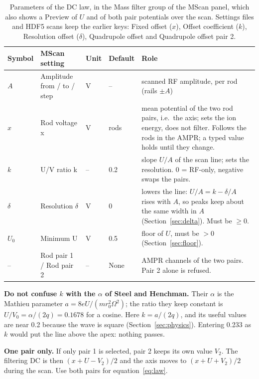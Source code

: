 \documentclass[10pt,a4paper]{article}
\newcommand{\setting}[1]{\textsf{#1}}
\begin{document}
\begin{table}[h]
\centering\small
\begin{tabularx}{\linewidth}{@{}l l l l X@{}}
\toprule
Symbol & MScan setting & Unit & Default & Role\\
\midrule
$A$ & \setting{Amplitude from / to / step} & V & -- & scanned RF amplitude, per rod (rails $\pm A$)\\
$x$ & \setting{Rod voltage x} & V & rods & mean potential of the two rod pairs, i.e.\ the axis; sets the
ion energy, does not filter. Follows the rods in the AMPR; a typed value holds until they change.\\
$k$ & \setting{U/V ratio k} & -- & 0.2 & slope $U/A$ of the scan line; sets the resolution.
$0$ = RF-only, negative swaps the pairs.\\
$\delta$ & \setting{Resolution $\delta$} & V & 0 & lowers the line: $U/A=k-\delta/A$ rises with
$A$, so peaks keep about the same width in $A$ (Section~\ref{sec:delta}). Must be $\ge0$.\\
$U_0$ & \setting{Minimum U} & V & 0.5 & floor of $U$, must be $>0$ (Section~\ref{sec:floor}).\\
-- & \setting{Rod pair 1 / Rod pair 2} & -- & None & AMPR channels of the two pairs.
Pair 2 alone is refused.\\
\bottomrule
\end{tabularx}
\caption{Parameters of the DC law, in the \setting{Mass filter} group of the MScan panel, which also
shows a \setting{Preview} of $U$ and of both pair potentials over the scan. Settings files and HDF5
scans keep the earlier keys: \setting{Fixed offset} ($x$), \setting{Offset coefficient} ($k$),
\setting{Resolution offset} ($\delta$), \setting{Quadrupole offset} and \setting{Quadrupole offset pair 2}.}
\end{table}

\textbf{Do not confuse $k$ with the $\alpha$ of Steel and Henchman.} Their $\alpha$ is the Mathieu
parameter $a=8eU/(m r_0^2\Omega^2)$; the ratio they keep constant is $U/V_0=\alpha/(2q)=0.1678$ for a
cosine. Here $k=a/(2q)$, and its useful values are near 0.2 because the wave is square
(Section~\ref{sec:physics}). Entering 0.233 as $k$ would put the line above the apex: nothing passes.

\textbf{One pair only.} If only pair 1 is selected, pair 2 keeps its own value $V_2$. The filtering DC
is then $(x+U-V_2)/2$ and the axis moves to $(x+U+V_2)/2$ during the scan. Use both pairs for
equation~\eqref{eq:law}.
\end{document}
